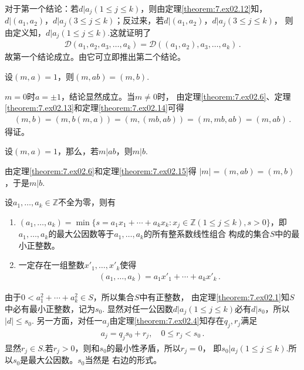 \begin{prove}
    对于第一个结论：若$d|a_j(1\le j\le k)$，则由定理\ref{theorem:7.ex02.12}知，
    $d|(a_1,a_2)$，$d|a_j(3\le j\le k)$；反过来，若$d|(a_1,a_2)$，$d|a_j(3\le j\le k)$，
    则由定义知，$d|a_j(1\le j\le k)$.这就证明了
    \begin{align}
        \mathcal{D}(a_1,a_2,a_3,\ldots,a_k)=\mathcal{D}((a_1,a_2),a_3,\ldots,a_k)\, .
    \end{align}
    故第一个结论成立。由它可立即推出第二个结论。
\end{prove}
\begin{theorem}\label{theorem:7.ex02.15}
    设$(m,a)=1$，则$(m,ab)=(m,b)$.
\end{theorem}
\begin{prove}
    $m=0$时$a=\pm1$，结论显然成立。当$m\neq0$时，
    由定理\ref{theorem:7.ex02.6}、定理\ref{theorem:7.ex02.13}和定理\ref{theorem:7.ex02.14}可得
    \begin{align}
        (m,b)=(m,b(m,a))=(m,(mb,ab))=(m,mb,ab)=(m,ab)\, .
    \end{align}
    得证。
\end{prove}
\begin{theorem}\label{theorem:7.ex02.16}
    设$(m,a)=1$，那么，若$m|ab$，则$m|b$.
\end{theorem}
\begin{prove}
    由定理\ref{theorem:7.ex02.6}和定理\ref{theorem:7.ex02.15}得
    $|m|=(m,ab)=(m,b)$，于是$m|b$.
\end{prove}
\begin{theorem}\label{theorem:7.ex02.17}
    设$a_1,\ldots,a_k\in\mathbb{Z}$不全为零，则有
    \begin{enumerate}
        \item $(a_1,\ldots,a_k)=\min\{s=a_1x_1+\cdots+a_kx_k:x_j\in\mathbb{Z}(1\le j\le k),s>0\}$，即
              $a_1,\ldots,a_k$的最大公因数等于$a_1,\ldots,a_k$的所有整系数线性组合
              构成的集合$S$中的最小正整数。
        \item 一定存在一组整数$x'_1,\ldots,x'_k$使得
              \begin{align}\label{eq:7.ex02.theorem17-02}
                  (a_1,\ldots,a_k)=a_1x'_1+\cdots+a_kx'_k\, .
              \end{align}
    \end{enumerate}
\end{theorem}
\begin{prove}
    由于$0<a_1^2+\cdots+a_k^2\in S$，所以集合$S$中有正整数，
    由定理\ref{theorem:7.ex02.1}知$S$中必有最小正整数，记为$s_0$.
    显然对任一公因数$d|a_j(1\le j \le k)$必有$d|s_0$，所以$|d|\le s_0$.
    另一方面，对任一$a_j$由定理\ref{theorem:7.ex02.4}知存在$q_j,r_j$满足
    \begin{align}
        a_j=q_js_0+r_j,\quad 0\le r_j<s_0\, .
    \end{align}
    显然$r_j\in S$.若$r_j>0$，则和$s_0$的最小性矛盾，所以$r_j=0$，
    即$s_0|a_j(1\le j \le k)$.所以$s_0$是最大公因数。$s_0$当然是
    右边的形式。
\end{prove}

